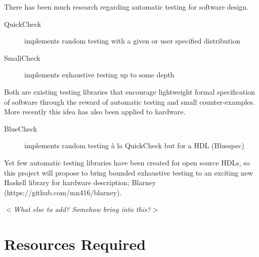 \documentclass[UKenglish, 12pt]{article}
\newcommand{\al}{$<$}
\newcommand{\ar}{$>$}
\begin{document}
There has been much research regarding automatic testing for software design.
\begin{description}

\item [QuickCheck] implements random testing with a given or user specified distribution~\cite{QuickCheck}

\item [SmallCheck] implements exhaustive testing up to some depth~\cite{SmallCheck}

\end{description}
Both are existing testing libraries that encourage lightweight formal specification
of software through the reward of automatic testing and small counter-examples.
More recently this idea has also been applied to hardware.
\begin{description}

\item [BlueCheck] implements random testing \`a la QuickCheck but for a HDL (Bluespec)~\cite{BlueCheck}

\end{description}

Yet few automatic testing libraries have been created for open source HDLs, so this
project will propose to bring bounded exhaustive testing to an exciting new
Haskell library for hardware description; Blarney (https://github.com/mn416/blarney).

\al\emph{What else to add? Somehow bring \cite{Koen} into this?}\ar




\section*{Resources Required}
\end{document}
